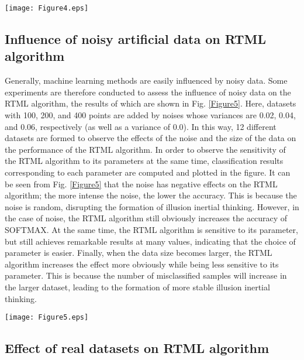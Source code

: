 \begin{figure*}
    \centering
 \texttt{[image: Figure4.eps]}
    \caption{Experimental results of RTML algorithm with different numbers of models }
\label{Figure4}
\end{figure*}

\subsection{Influence of noisy artificial data on RTML algorithm}

Generally, machine learning methods are easily influenced by noisy data. Some experiments are therefore conducted to assess the influence of noisy data on the RTML algorithm, the results of which are shown in Fig. \ref{Figure5}. Here, datasets with 100, 200, and 400 points are added by noises whose variances are 0.02, 0.04, and 0.06, respectively (as well as a variance of 0.0). In this way, 12 different datasets are formed to observe the effects of the noise and the size of the data on the performance of the RTML algorithm. In order to observe the sensitivity of the RTML algorithm to its parameters at the same time, classification results corresponding to each parameter are computed and plotted in the figure. It can be seen from Fig. \ref{Figure5} that the noise has negative effects on the RTML algorithm; the more intense the noise, the lower the accuracy. This is because the noise is random, disrupting the formation of illusion inertial thinking. However, in the case of noise, the RTML algorithm still obviously increases the accuracy of SOFTMAX. At the same time, the RTML algorithm is sensitive to its parameter, but still achieves remarkable results at many values, indicating that the choice of parameter is easier. Finally, when the data size becomes larger, the RTML algorithm increases the effect more obviously while being less sensitive to its parameter. This is because the number of misclassified samples will increase in the larger dataset, leading to the formation of more stable illusion inertial thinking.

\begin{figure*}[htbp]
    \centering
 \texttt{[image: Figure5.eps]}
    \caption{Experimental results of RTML algorithm with different numbers of models}
\label{Figure5}
\end{figure*}

\subsection{Effect of real datasets on RTML algorithm}

